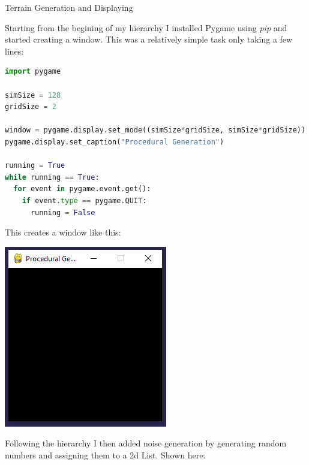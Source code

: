 \begin{flushleft}
\begin{enumerate}
            \vspace{0.5cm}

            {\Large Terrain Generation and Displaying} \\
            \vspace{0.25cm}

            Starting from the begining of my hierarchy I installed Pygame using \textit{pip} and started creating a window.
            This was a relatively simple task only taking a few lines:
            \vspace{0.5cm}

            \normalsize
            \begin{lstlisting}[language=Python]
import pygame

simSize = 128
gridSize = 2

window = pygame.display.set_mode((simSize*gridSize, simSize*gridSize))
pygame.display.set_caption("Procedural Generation")

running = True
while running == True:
  for event in pygame.event.get():
    if event.type == pygame.QUIT:
      running = False
            \end{lstlisting}

            \vspace{0.5cm}

            \large
            This creates a window like this: \\ 
            \vspace{0.5cm}
            \centerline{\includegraphics{Images/Prototype/CreateWindowExample.PNG}}

            \vspace{0.5cm}

            Following the hierarchy I then added noise generation by generating random numbers and 
            assigning them to a 2d List. Shown here: 
            

\end{enumerate}
\end{flushleft}
